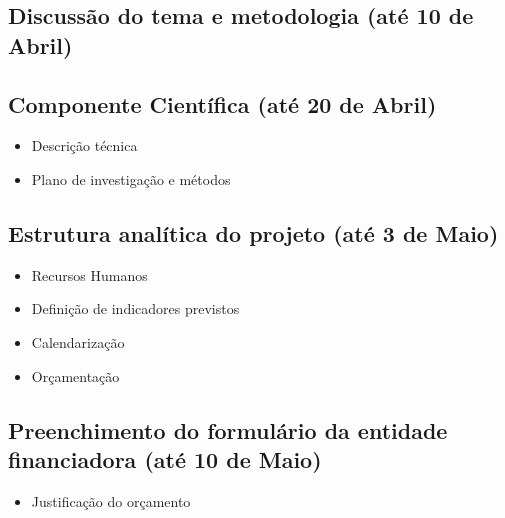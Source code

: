 \documentclass[%
	nofootinbib,
	amsmath,amssymb,
	aps,
	12pt,
	a4paper
]{article}
\begin{document}
\subsection{Discussão do tema e metodologia (até 10 de Abril)}

\subsection{Componente Científica (até 20 de Abril)}
\begin{itemize}
	\item Descrição técnica
	\item Plano de investigação e métodos
\end{itemize}

\subsection{Estrutura analítica do projeto (até 3 de Maio)}
\begin{itemize}
	\item Recursos Humanos
	\item Definição de indicadores previstos
	\item Calendarização
	\item Orçamentação
\end{itemize}
\subsection{Preenchimento do formulário da entidade financiadora (até 10 de Maio)}
\begin{itemize}
	\item Justificação do orçamento
\end{itemize}





\nocite{*}
{}
\end{document}
